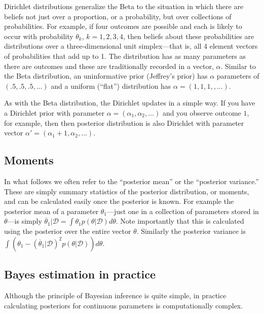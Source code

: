 \documentclass[
  12pt,
]{book}
\begin{document}
Dirichlet distributions generalize the Beta to the situation in which there are beliefs not just over a proportion, or a probability, but over collections of probabilities. For example, if four outcomes are possible and each is likely to occur with probability \(\theta_k\), \(k=1,2,3,4\), then beliefs about these probabilities are distributions over a three-dimensional unit simplex---that is, all 4 element vectors of probabilities that add up to 1. The distribution has as many parameters as there are outcomes and these are traditionally recorded in a vector, \(\alpha\). Similar to the Beta distribution, an uninformative prior (Jeffrey's prior) has \(\alpha\) parameters of \((.5,.5,.5, \dots)\) and a uniform (``flat'') distribution has \(\alpha = (1,1,1,,\dots)\).

As with the Beta distribution, the Dirichlet updates in a simple way. If you have a Dirichlet prior with parameter \(\alpha = (\alpha_1, \alpha_2, \dots)\) and you observe outcome \(1\), for example, then then posterior distribution is also Dirichlet with parameter vector \(\alpha' = (\alpha_1+1, \alpha_2,\dots)\).

\hypertarget{moments}{%
\subsection{Moments}\label{moments}}

In what follows we often refer to the ``posterior mean'' or the ``posterior variance.'' These are simply summary statistics of the posterior distribution, or moments, and can be calculated easily once the posterior is known. For example the posterior mean of a parameter \(\theta_1\)---just one in a collection of parameters stored in \(\theta\)---is simply \(\overline{\theta}_1 | \mathcal{D} = \int \theta_1 p(\theta | \mathcal{D}) d\theta\). Note importantly that this is calculated using the posterior over the entire vector \(\theta\). Similarly the posterior variance is \(\int (\theta_1 - (\overline{\theta}_1 | \mathcal{D})^2 p(\theta | \mathcal{D})) d\theta\).

\hypertarget{bayes-estimation-in-practice}{%
\subsection{Bayes estimation in practice}\label{bayes-estimation-in-practice}}

Although the principle of Bayesian inference is quite simple, in practice calculating posteriors for continuous parameters is computationally complex.
\end{document}
